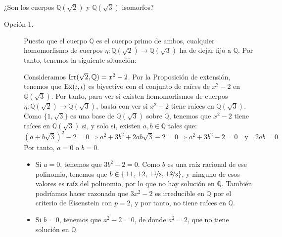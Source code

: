 \begin{ejercicio}
    ¿Son los cuerpos $\mathbb{Q}(\sqrt{2})$ y $\mathbb{Q}(\sqrt{3})$ isomorfos?

    \begin{description}
        \item[Opción 1.] Puesto que el cuerpo $\mathbb{Q}$ es el cuerpo primo de ambos, cualquier homomorfismo de cuerpos $\eta:\mathbb{Q}(\sqrt{2})\to \mathbb{Q}(\sqrt{3})$ ha de dejar fijo a $\mathbb{Q}$. Por tanto, tenemos la siguiente situación:
        \begin{figure}[H]
            \centering
        \end{figure}

        Consideramos $\operatorname{Irr}(\sqrt{2},\mathbb{Q}) = x^2-2$. Por la Proposición de extensión, tenemos que $\operatorname{Ex}(\iota,\iota)$ es biyectivo con el conjunto de raíces de $x^2-2$ en $\mathbb{Q}(\sqrt{3})$. Por tanto, para ver si existen homomorfismos de cuerpos $\eta:\mathbb{Q}(\sqrt{2})\to \mathbb{Q}(\sqrt{3})$, basta con ver si $x^2-2$ tiene raíces en $\mathbb{Q}(\sqrt{3})$.\\

        Como $\{1,\sqrt{3}\}$ es una base de $\mathbb{Q}(\sqrt{3})$ sobre $\mathbb{Q}$, tenemos que $x^2-2$ tiene raíces en $\mathbb{Q}(\sqrt{3})$ si, y solo si, existen $a,b\in \mathbb{Q}$ tales que:
        \begin{equation*}
            (a+b\sqrt{3})^2 - 2 = 0 \Longrightarrow a^2 + 3b^2 + 2ab\sqrt{3} - 2 = 0 \Longrightarrow a^2 + 3b^2 - 2 = 0 \quad\text{y}\quad 2ab = 0
        \end{equation*}
        Por tanto, $a=0$ o $b=0$.
        \begin{itemize}
            \item Si $a=0$, tenemos que $3b^2-2 = 0$. Como $b$ es una raíz racional de ese polinomio, tenemos que $b\in \{\pm 1, \pm 2, \pm \nicefrac{1}{3}, \pm \nicefrac{2}{3}\}$, y ninguno de esos valores es raíz del polinomio, por lo que no hay solución en $\mathbb{Q}$. También podríamos hacer razonado que $3x^2-2$ es irreducible en $\mathbb{Q}$ por el criterio de Eisenstein con $p=2$, y por tanto, no tiene raíces en $\mathbb{Q}$.
            \item Si $b=0$, tenemos que $a^2-2 = 0$, de donde $a^2 = 2$, que no tiene solución en $\mathbb{Q}$.
        \end{itemize}


\end{description}
\end{ejercicio}
